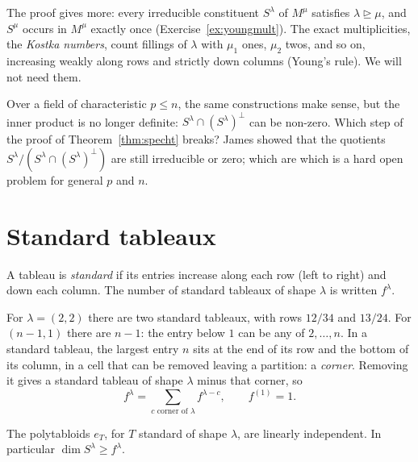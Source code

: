 The proof gives more: every irreducible constituent $S^\lambda$ of $M^\mu$ satisfies $\lambda\trianglerighteq\mu$, and $S^\mu$ occurs in $M^\mu$ exactly once (Exercise~\ref{ex:youngmult}). The exact multiplicities, the \emph{Kostka numbers}, count
fillings of $\lambda$ with $\mu_1$ ones, $\mu_2$ twos, and so on, increasing weakly along rows and strictly down columns (Young's rule). We will not need them.

\begin{think}
Over a field of characteristic $p\le n$, the same constructions make sense, but the inner product is no longer definite: $S^\lambda\cap(S^\lambda)^\perp$ can be non-zero. Which step of the proof of Theorem~\ref{thm:specht} breaks? James showed that
the quotients $S^\lambda/(S^\lambda\cap(S^\lambda)^\perp)$ are still irreducible or zero; which are which is a hard open problem for general $p$ and $n$.
\end{think}

\section{Standard tableaux}

\begin{definition}\label{def:standard}
A tableau is \emph{standard} if its entries increase along each row (left to right) and down each column. The number of standard tableaux of shape $\lambda$ is written $f^\lambda$.
\end{definition}

For $\lambda=(2,2)$ there are two standard tableaux, with rows $12/34$ and $13/24$. For $(n-1,1)$ there are $n-1$: the entry below $1$ can be any of $2,\dots,n$. In a standard tableau, the largest entry $n$ sits at the end of its row
and the bottom of its column, in a cell that can be removed leaving a partition: a \emph{corner}. Removing it gives a standard tableau of shape $\lambda$ minus that corner, so
\begin{equation}\label{eq:frecur}
f^\lambda=\sum_{c\text{ corner of }\lambda}f^{\lambda-c},\qquad f^{(1)}=1.
\end{equation}

\begin{theorem}\label{thm:standardbasis}
The polytabloids $e_T$, for $T$ standard of shape $\lambda$, are linearly independent. In particular $\dim S^\lambda\ge f^\lambda$.
\end{theorem}

